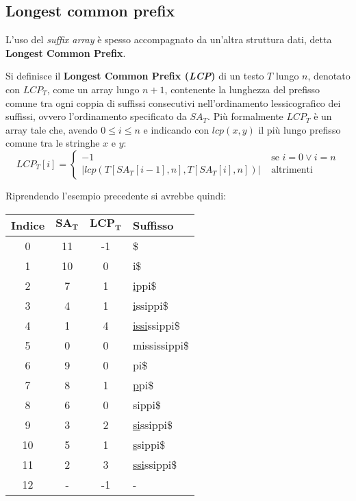 \subsection{Longest common prefix}
L'uso del \textit{suffix array} è spesso accompagnato da un'altra struttura
dati, detta \textbf{Longest Common Prefix}.
\begin{definizione}
  Si definisce il \textbf{Longest Common Prefix (\emph{LCP})} di un testo $T$
  lungo $n$,
  denotato con $LCP_T$, come un array lungo $n+1$, contenente la
  lunghezza del prefisso comune tra ogni coppia di suffissi consecutivi
  nell'ordinamento lessicografico dei suffissi, ovvero l'ordinamento specificato
  da $SA_T$. Più formalmente
  $LCP_T$ è un array tale che, avendo $0\leq i\leq n$ e indicando con $lcp(x,y)$
  il più lungo prefisso comune tra le stringhe $x$ e $y$:
  \begin{equation}
    \label{eq:lcpdef}
    LCP_T[i]=
    \begin{cases}
      -1&\mbox{ se } i=0 \lor i=n\\
      \left|lcp(T[SA_T[i-1], n],T[SA_T [i], n])\right|&\mbox{ altrimenti}
    \end{cases}
  \end{equation}
\end{definizione}
\begin{esempio}
  Riprendendo l'esempio precedente si avrebbe quindi:
  \begin{table}[H]
    \centering
    \footnotesize
    \begin{tabular}{c|c|c|l} 
      \textbf{Indice} & $\mathbf{SA_T}$ & $\mathbf{LCP_T}$ & \textbf{Suffisso}\\ 
      \hline
      0 & 11 & -1 & \$\\
      1 & 10 & 0 & i\$\\
      2 & 7 & 1 & \underline{i}ppi\$\\
      3 & 4 & 1 & \underline{i}ssippi\$\\
      4 & 1 & 4 & \underline{issi}ssippi\$\\
      5 & 0 & 0 & mississippi\$\\
      6 & 9 & 0 & pi\$\\
      7 & 8 & 1 & \underline{p}pi\$\\
      8 & 6 & 0 & sippi\$\\
      9 & 3 & 2 & \underline{si}ssippi\$\\
      10 & 5 & 1 & \underline{s}sippi\$\\
      11 & 2 & 3 & \underline{ssi}ssippi\$\\
      12 & - & -1 & -
    \end{tabular}
  \end{table}
\end{esempio}
